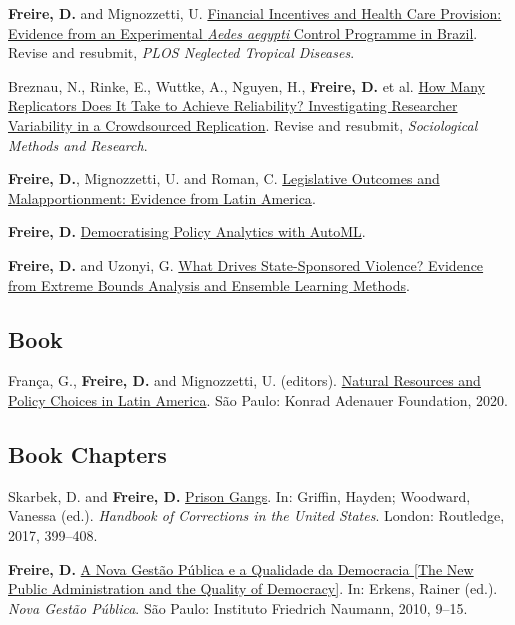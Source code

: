 \documentclass[a4paper]{article}
\renewenvironment{itemize}{
	\begin{list}{}{
			\setlength{\leftmargin}{1.5em}
		}
		}{
	\end{list}
}
\begin{document}
\begin{itemize}
\item \textbf{Freire, D.} and Mignozzetti, U. \href{https://github.com/danilofreire/incentives-healthcare}{Financial Incentives and Health Care Provision: Evidence from an Experimental \textit{Aedes aegypti} Control Programme in Brazil}. Revise and resubmit, \textit{PLOS Neglected Tropical Diseases}.
\item Breznau, N., Rinke, E., Wuttke, A., Nguyen, H., \textbf{Freire, D.} et al. \href{https://osf.io/preprints/socarxiv/j7qta/}{How Many Replicators Does It Take to Achieve Reliability? Investigating Researcher Variability in a Crowdsourced Replication}. Revise and resubmit, \textit{Sociological Methods and Research}. 
\item \textbf{Freire, D.}, Mignozzetti, U. and Roman, C. \href{https://github.com/danilofreire/danilofreire.github.io/blob/master/malapportionment.pdf}{Legislative Outcomes and Malapportionment: Evidence from Latin America}.
\item \textbf{Freire, D.} \href{https://github.com/danilofreire/mercatus-analytics-papers/blob/main/automl-paper/automl.pdf}{Democratising Policy Analytics with AutoML}. 
\item \textbf{Freire, D.} and Uzonyi, G. \href{https://osf.io/pzx3q}{What Drives State-Sponsored Violence? Evidence from Extreme Bounds Analysis and Ensemble Learning Methods}.
\end{itemize}

\subsection*{Book}

\begin{itemize}
\item França, G., \textbf{Freire, D.} and Mignozzetti, U. (editors). \href{https://github.com/danilofreire/danilofreire.github.io/blob/01dc4c9566bb5ade15b5db950046ed0a386fc5f1/texts/natural_resources_policy_choices_latam.pdf}{Natural Resources and Policy Choices in Latin America}. São Paulo: Konrad Adenauer Foundation, 2020.
\end{itemize}

\subsection*{Book Chapters}

\begin{itemize}
\item Skarbek, D. and \textbf{Freire, D.} \href{https://osf.io/kuqqx/}{Prison Gangs}. In: Griffin, Hayden; Woodward, Vanessa (ed.). \textit{Handbook of Corrections in the United States}. London: Routledge, 2017, 399--408.
\item \textbf{Freire, D.} \href{https://fnst.org/sites/default/files/uploads/2017/12/08/ngp.pdf}{A Nova Gest\~{a}o P\'{u}blica e a Qualidade da Democracia {[}The New Public Administration and the Quality of Democracy{]}}. In: Erkens, Rainer (ed.). \textit{Nova Gest\~{a}o P\'{u}blica}. S\~{a}o Paulo: Instituto Friedrich Naumann, 2010, 9--15.
\end{itemize}
\end{document}

